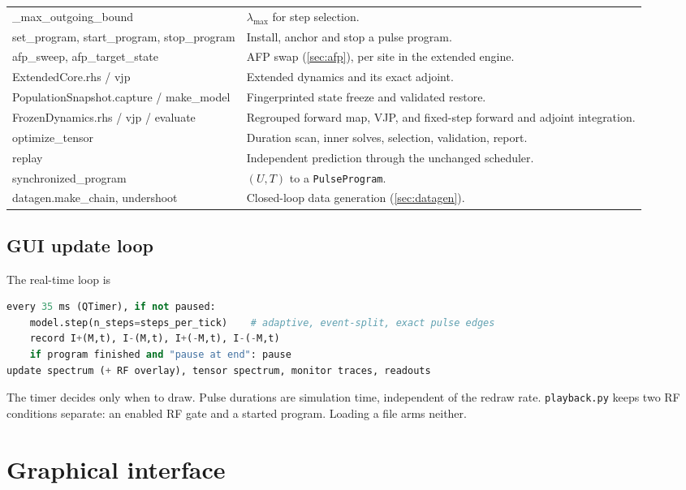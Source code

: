 \documentclass[11pt]{article}
\newcommand{\code}[1]{\texttt{#1}}
\begin{document}
\begin{longtable}{>{\ttfamily}L{0.36\textwidth} L{0.58\textwidth}}
\_max\_outgoing\_bound & \(\lambda_{\max}\) for step selection.\\
set\_program, start\_program, stop\_program & Install, anchor and stop a pulse program.\\
afp\_sweep, afp\_target\_state & AFP swap (\cref{sec:afp}), per site in the extended engine.\\
ExtendedCore.rhs / vjp & Extended dynamics and its exact adjoint.\\
PopulationSnapshot.capture / make\_model & Fingerprinted state freeze and validated restore.\\
FrozenDynamics.rhs / vjp / evaluate & Regrouped forward map, VJP, and fixed-step forward and adjoint integration.\\
optimize\_tensor & Duration scan, inner solves, selection, validation, report.\\
replay & Independent prediction through the unchanged scheduler.\\
synchronized\_program & \((U,T)\) to a \code{PulseProgram}.\\
datagen.make\_chain, undershoot & Closed-loop data generation (\cref{sec:datagen}).\\
\bottomrule
\end{longtable}

\subsection{GUI update loop}

The real-time loop is
\begin{lstlisting}[language=Python,caption={Simplified GUI update logic.}]
every 35 ms (QTimer), if not paused:
    model.step(n_steps=steps_per_tick)    # adaptive, event-split, exact pulse edges
    record I+(M,t), I-(M,t), I+(-M,t), I-(-M,t)
    if program finished and "pause at end": pause
update spectrum (+ RF overlay), tensor spectrum, monitor traces, readouts
\end{lstlisting}
The timer decides only when to draw. Pulse durations are simulation time, independent of the
redraw rate. \code{playback.py} keeps two RF conditions separate: an enabled RF gate and a
started program. Loading a file arms neither.

\section{Graphical interface}
\label{sec:gui}
\end{document}
